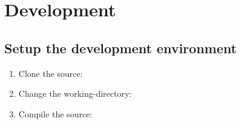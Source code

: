 \chapter{Development}\label{ch:development}
\section{Setup the development environment}
\begin{enumerate}
    \item Clone the source: 
    \item Change the working-directory: 
    \item Compile the source: 
\end{enumerate}

